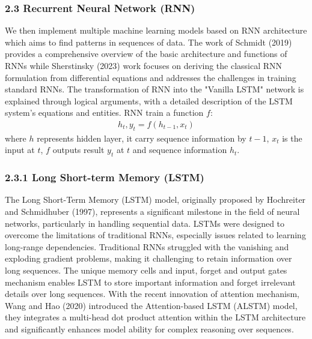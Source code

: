 \documentclass[10pt,letterpaper]{article}
\begin{document}
\subsubsection*{2.3 Recurrent Neural Network (RNN)}
We then implement multiple machine learning models based on RNN architecture which aims to find patterns in sequences of data. The work of Schmidt (2019) provides a comprehensive overview of the basic architecture and functions of RNNs while Sherstinsky (2023) work focuses on deriving the classical RNN formulation from differential equations and addresses the challenges in training standard RNNs. The transformation of RNN into the "Vanilla LSTM" network is explained through logical arguments, with a detailed description of the LSTM system's equations and entities.
RNN train a function $f$:
\begin{eqnarray}
\label{eq: RNN}
    {h_{t}, y_t} = f(h_{t - 1}, x_t)
\end{eqnarray}
where $h$ represents hidden layer, it carry sequence information by $t - 1$, $x_t$ is the input at $t$, $f$ outputs result $y_t$ at $t$ and sequence information $h_t$.

\subsubsection*{2.3.1 Long Short-term Memory (LSTM)}
The Long Short-Term Memory (LSTM) model, originally proposed by Hochreiter and Schmidhuber (1997), represents a significant milestone in the field of neural networks, particularly in handling sequential data. LSTMs were designed to overcome the limitations of traditional RNNs, especially issues related to learning long-range dependencies. Traditional RNNs struggled with the vanishing and exploding gradient problems, making it challenging to retain information over long sequences. The unique memory cells and input, forget and output gates mechanism enables LSTM to store important information and forget irrelevant details over long sequences. With the recent innovation of attention mechanism, Wang and Hao (2020) introduced the Attention-based LSTM (ALSTM) model, they integrates a multi-head dot product attention within the LSTM architecture and significantly enhances model ability for complex reasoning over sequences.
\end{document}
